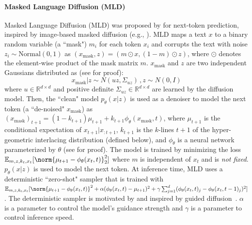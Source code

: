\documentclass{article} %
\begin{document}
\paragraph{Masked Language Diffusion (MLD)}
Masked Language Diffusion (MLD) was proposed by \citet{austin2023structured} for next-token prediction, inspired by image-based masked diffusion (e.g., \citet{dhariwal2021diffusionmodelsbeatgans}). MLD maps a text $x$ to a binary random variable (a ``mask") $m_i$ for each token $x_i$ and corrupts the text with noise $z_i \sim \mathrm{Normal(0,1)}$ as $(x_\mathrm{mask},z) = (m\odot x, (1-m)\odot z)$, where
$\odot$ denotes the element-wise product of the mask matrix $m$. $x_\mathrm{mask}$ and $z$ are two independent Gaussians distributed as (see \citet{austin2023structured} for proof):
\begin{equation}\label{eq:normal}
    x_\mathrm{mask} | z \sim N(uz, \Sigma_{uz})\,,
    z \sim N(0, I)
\end{equation}
where $u \in \mathbb{R}^{d\times d}$ and positive definite $\Sigma_{uz}\in \mathbb R^{d\times d}$ are learned by the diffusion model. Then, the ``clean" model $p_\theta(x|z)$ is used as a denoiser to model the next token (a ``de-noised" $x_\mathrm{mask}$) as $(x_\mathrm{mask})_{t+1} = (1-k_{t+1})\mu_{t+1} + k_{t+1}\phi_\theta(x_{\mathrm{mask}},t)$, where $\mu_{t+1}$ is the conditional expectation of $x_{t+1}|x_{:t+1}$, $k_{t+1}$ is the $k$-lines $t+1$ of the hyper-geometric interlacing distribution (defined below), and $\phi_\theta$ is a neural network parameterized by $\theta$ (see \citet{austin2023structured} for proof). The model is trained by minimizing the loss $\mathbb{E}_{m,z,k_t,x_t}[\norm{\mu_{t+1} - \phi_\theta(x_t, t)}_2^2]$ where $m$ is independent of $x_t$ and is \textit{not fixed}. $p_\theta(x|z)$ is used to model the next token. At inference time, MLD uses a deterministic ``zero-shot" sampler that is trained with $\mathbb{E}_{m,z,k_t,x_t}[\norm{\mu_{t+1} - \phi_\theta(x_t, t)}^2+\alpha(\phi_\theta(x_t, t)- \mu_{t+1})^2 + \gamma \sum_{j=1}^d (\phi_\theta(x_t, t)_j - \phi_\theta(x_t, t-1)_j)^2]$. 
The deterministic sampler is motivated by \citet{austin2023structured} and inspired by guided diffusion~\citep{dhariwal2021diffusionmodelsbeatgans}. $\alpha$ is a parameter to control the model's guidance strength and $\gamma$ is a parameter to control inference speed. 
\end{document}
